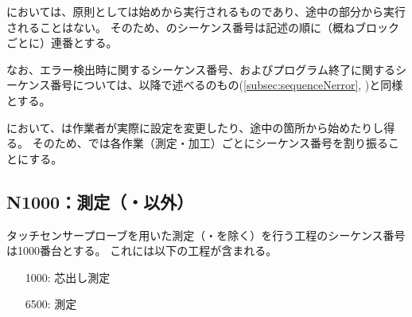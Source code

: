 \DMC においては、原則として\CreatedNCSubPrg は始めから実行されるものであり、途中の部分から実行されることはない。
そのため、\nameCreatedNCSubPrg のシーケンス番号は記述の順に（概ねブロックごとに）連番とする。

なお、エラー検出時に関するシーケンス番号、およびプログラム終了に関するシーケンス番号については、以降で述べる\CreatedNCMainPrg のもの(\autoref{subsec:sequenceNerror}, )と同様とする。



\clearpage
\DMC において、\CreatedNCMainPrg は作業者が実際に設定を変更したり、途中の箇所から始めたりし得る。
そのため、\CreatedNCMainPrg では各作業（測定・加工）ごとにシーケンス番号を割り振ることにする。


\subsection{N1000：測定（\Dimple・\ReliefGroove 以外）}
タッチセンサープローブを用いた測定（\Dimple ・\ReliefGroove を除く）を行う工程のシーケンス番号は1000番台とする。
これには以下の工程が含まれる。
\begin{enumerate}
\item[1000:] 芯出し測定
\item[6500:] \nameCenterlineEndFaceDif 測定
\end{enumerate}


